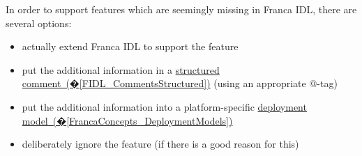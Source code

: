 \documentclass[a4paper,10pt]{scrreprt}
\newlength{\XdocItemIndent}
\begin{document}
In order to support features which are seemingly missing in Franca IDL,
there are several options:
\setlength{\XdocItemIndent}{\textwidth}
\begin{itemize}
\addtolength{\XdocItemIndent}{-2.5em}
\item \begin{minipage}[t]{\XdocItemIndent}
actually extend Franca IDL to support the feature

\end{minipage}
\item \begin{minipage}[t]{\XdocItemIndent}
put the additional information in a \hyperref[FIDL_CommentsStructured]{structured comment~(�\ref*{FIDL_CommentsStructured})}
	     (using an appropriate @-tag)

\end{minipage}
\item \begin{minipage}[t]{\XdocItemIndent}
put the additional information into a
	     platform-specific \hyperref[FrancaConcepts_DeploymentModels]{deployment model~(�\ref*{FrancaConcepts_DeploymentModels})}

\end{minipage}
\item \begin{minipage}[t]{\XdocItemIndent}
deliberately ignore the feature (if there is a good reason for this)

\end{minipage}
\end{itemize}
\addtolength{\XdocItemIndent}{2.5em}
\end{document}
